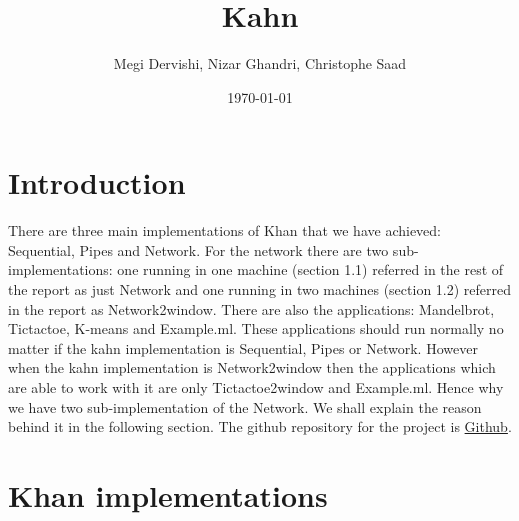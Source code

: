 \documentclass[10pt,a4paper]{article}
\title{Kahn}
\author{Megi Dervishi, Nizar Ghandri, Christophe Saad}
\date{\today}
\begin{document}
\maketitle
\section{Introduction}
There are three main implementations of Khan that we have achieved: Sequential, Pipes and Network. For the network there are two sub-implementations: one running in one machine (section 1.1) referred in the rest of the report as just Network and one running in two machines (section 1.2) referred in the report as Network2window. There are also the applications: Mandelbrot, Tictactoe, K-means and Example.ml. These applications should run normally no matter if the kahn implementation is Sequential, Pipes or Network. However when the kahn implementation is Network2window then the applications which are able to work with it are only Tictactoe2window and Example.ml. Hence why we have two sub-implementation of the Network. We shall explain the reason behind it in the following section. The github repository for the project is \href{https://github.com/xopheS/kpn}{\color{blue}Github}.

\section{Khan implementations }
\end{document}
